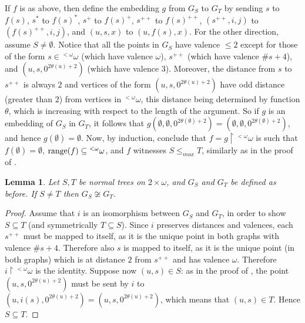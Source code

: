 \documentclass{amsart}
\newtheorem{lemma}[theorem]{Lemma}
\theoremstyle{definition}
\theoremstyle{remark}
\begin{document}
If $f$ is as above,
then define the embedding $g$ from $G_S$ to $G_T$ by sending $s$ to
$f(s)$, $s^*$ to $f(s)^*$, $s^+$ to $f(s)^+$, $s^{++}$ to $f(s)^{++}$,
$(s^{++},i,j)$ to $(f(s)^{++}, i,j)$, and $(u,s,x)$ to
$(u,f(s),x)$. For the other direction, assume $S \neq \emptyset$.
Notice that all the points in
$G_S$ have valence $\leq 2$ except for those of the form $s \in
{{}^{<\omega}\omega}$ (which have valence $\omega$), $s^{++}$ (which have valence
$\#s +4$), and $(u,s,0^{2 \theta(u)+2})$ (which have valence
$3$). Moreover, the distance from $s$ to $s^{++}$ is always $2$
 and vertices of the form $(u,s,0^{2 \theta(u)+2})$
have odd distance (greater than $2$) from
vertices in ${{}^{<\omega}\omega}$, this distance being determined by
function $\theta $, which is increasing with respect to the length of
the argument.
So if $g$ is an embedding
of $G_S$ in $G_T$, it follows that
$g(\emptyset , \emptyset , 0^{2\theta(\emptyset)+2})  =  (\emptyset ,
\emptyset, 0^{2\theta(\emptyset)+2})$, and hence $g(\emptyset)  =  \emptyset$.
Now, by induction, conclude that
$f = g \restriction {{}^{<\omega}\omega}$ is such that $f(\emptyset) = \emptyset$,
${\rm range}(f) \subseteq {{}^{<\omega}\omega}$, and $f$
witnesses $S \leq_{max} T$, similarly as in the proof of \cite[Theorem
3.1]{louros}.

\begin{lemma}\label{lemma1}
 Let $S,T$ be normal trees on $2\times\omega $, and $G_S$ and $G_T$ be defined as before.
If $S \neq T$ then $G_S \not\cong G_T$.
\end{lemma}

\begin{proof}
 Assume that $i$ is an isomorphism between $G_S$ and
$G_T$, in order to show $S\subseteq T$ (and symmetrically $T\subseteq S$). Since $i$ preserves distances and valences, each $s^{++}$
must be mapped to itself, as it is the unique point in both
graphs with valence $\# s +4$. Therefore also $s$ is mapped to
itself, as it is the unique point (in both graphs) which is at
distance $2$ from $s^{++}$ and has valence $\omega$. Therefore $i
\restriction {{}^{<\omega}\omega}$ is the identity. Suppose now $(u,s) \in S$:
 as in the proof of \cite[Theorem 3.1]{louros}, the point
 $(u,s,0^{2\theta(u)+2})$  must be sent by $i$ to $(u,i(s),0^{2\theta(u)+2}) =
 (u,s,0^{2 \theta(u)+2})$, which means that $(u,s) \in T$. Hence $S
 \subseteq T$.
\end{proof}
\end{document}
